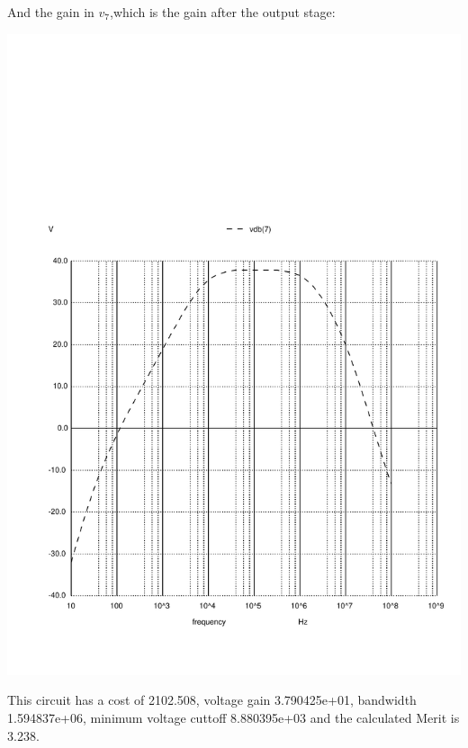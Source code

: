 And the gain in $v_7$,which is the gain after the output stage:

\includegraphics[width=0.8\linewidth]{../sim/vo2f.pdf}

\par


This circuit has a cost of 2102.508, voltage gain 3.790425e+01, bandwidth 1.594837e+06, minimum voltage cuttoff 8.880395e+03 and the  calculated Merit is 3.238.